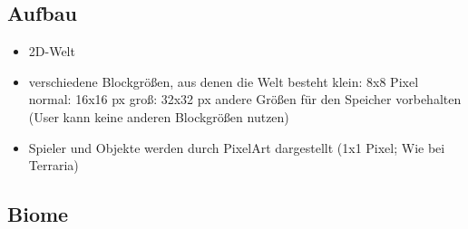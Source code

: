 \subsection{Aufbau}
\label{subsec:aufbau}
	\begin{itemize}
		\item 2D-Welt
		\item verschiedene Blockgrößen, aus denen die Welt besteht
		\subitem klein: 8x8 Pixel
		\subitem normal: 16x16 px
		\subitem groß: 32x32 px
		\subitem andere Größen für den Speicher vorbehalten (User kann keine anderen Blockgrößen nutzen)
		\item Spieler und Objekte werden durch PixelArt dargestellt (1x1 Pixel; Wie bei Terraria)
	\end{itemize}

\subsection{Biome}
\label{subsec:biome}
